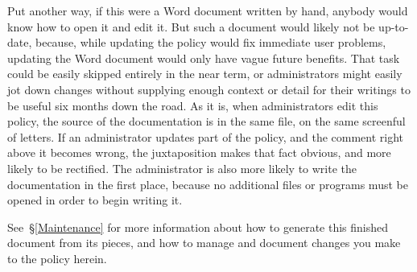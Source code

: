 Put another way, if this were a Word document written by hand, anybody
would know how to open it and edit it. But such a document would likely
not be up-to-date, because, while updating the policy would fix immediate
user problems, updating the Word document would only have vague future
benefits. That task could be easily skipped entirely in the near term, or
administrators might easily jot down changes without supplying enough
context or detail for their writings to be useful six months down the
road. As it is, when administrators edit this policy, the source of the
documentation is in the same file, on the same screenful of letters. If
an administrator updates part of the policy, and the comment right above
it becomes wrong, the juxtaposition makes that fact obvious, and more
likely to be rectified. The administrator is also more likely to write the
documentation in the first place, because no additional files or programs
must be opened in order to begin writing it.

See~\S\ref{Maintenance} for more information about how to generate this
finished document from its pieces, and how to manage and document changes
you make to the policy herein.
